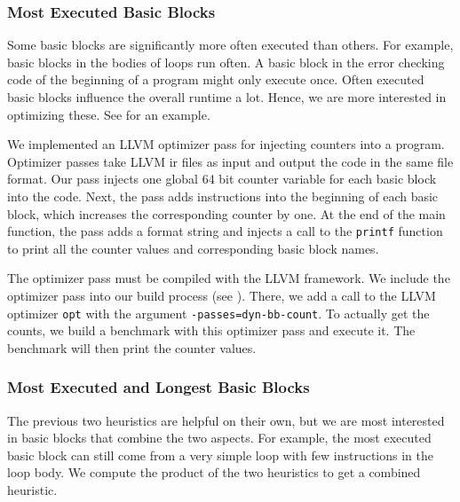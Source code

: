 \subsubsection{Most Executed Basic Blocks}
Some basic blocks are significantly more often executed than others.
For example, basic blocks in the bodies of loops run often.
A basic block in the error checking code of the beginning of a program might only execute once.
Often executed basic blocks influence the overall runtime a lot.
Hence, we are more interested in optimizing these.
See  for an example.

We implemented an LLVM optimizer pass for injecting counters into a program.
Optimizer passes take LLVM \ac{ir} files as input and output the code in the same file format.
Our pass injects one global 64 bit counter variable for each basic block into the code.
Next, the pass adds instructions into the beginning of each basic block, which increases the corresponding counter by one.
At the end of the main function, the pass adds a format string and injects a call to the \lstinline{printf} function to print all the counter values and corresponding basic block names.

The optimizer pass must be compiled with the LLVM framework.
We include the optimizer pass into our build process (see ).
There, we add a call to the LLVM optimizer \lstinline{opt} with the argument \mbox{\lstinline{-passes=dyn-bb-count}}.
To actually get the counts, we build a benchmark with this optimizer pass and execute it.
The benchmark will then print the counter values.

\subsubsection{Most Executed and Longest Basic Blocks}
The previous two heuristics are helpful on their own, but we are most interested in basic blocks that combine the two aspects.
For example, the most executed basic block can still come from a very simple loop with few instructions in the loop body.
We compute the product of the two heuristics to get a combined heuristic.

